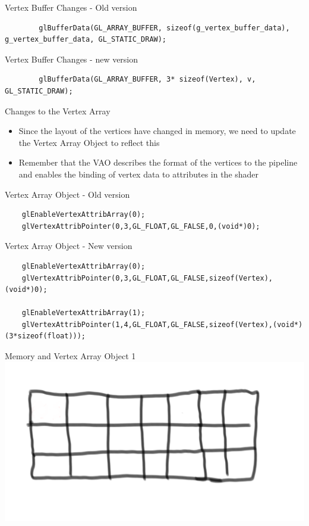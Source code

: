 \begin{frame}[fragile]{Vertex Buffer Changes - Old version}
	\begin{lstlisting}
		glBufferData(GL_ARRAY_BUFFER, sizeof(g_vertex_buffer_data), g_vertex_buffer_data, GL_STATIC_DRAW);
	\end{lstlisting}
\end{frame}

\begin{frame}[fragile]{Vertex Buffer Changes - new version}
	\begin{lstlisting}
		glBufferData(GL_ARRAY_BUFFER, 3* sizeof(Vertex), v, GL_STATIC_DRAW);
	\end{lstlisting}
\end{frame}

\begin{frame}{Changes to the Vertex Array}
	\begin{itemize}
		\pause\item Since the layout of the vertices have changed in memory, we need to update the Vertex Array Object to reflect this
		\pause\item Remember that the VAO describes the format of the vertices to the pipeline and enables the binding of vertex data to attributes in the shader 
	\end{itemize}
\end{frame}

\begin{frame}[fragile]{Vertex Array Object - Old version}
\begin{lstlisting}
	glEnableVertexAttribArray(0);
	glVertexAttribPointer(0,3,GL_FLOAT,GL_FALSE,0,(void*)0);
\end{lstlisting}
\end{frame}

\begin{frame}[fragile]{Vertex Array Object - New version}
\begin{lstlisting}
	glEnableVertexAttribArray(0);
	glVertexAttribPointer(0,3,GL_FLOAT,GL_FALSE,sizeof(Vertex),(void*)0);
	
	glEnableVertexAttribArray(1);
	glVertexAttribPointer(1,4,GL_FLOAT,GL_FALSE,sizeof(Vertex),(void*)(3*sizeof(float)));
\end{lstlisting}
\end{frame}

\begin{frame}{Memory and Vertex Array Object 1}
		\includegraphics[height=0.8\textheight]{MemoryLayoutStarter}	
\end{frame}

